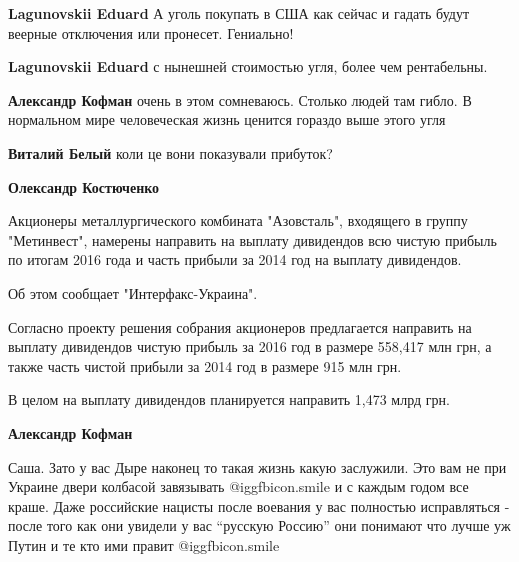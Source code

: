 \begin{itemize}
\begin{itemize}
\textbf{Lagunovskii Eduard} А уголь покупать в США как сейчас и гадать будут веерные отключения или пронесет. Гениально!

\textbf{Lagunovskii Eduard} с нынешней стоимостью угля, более чем рентабельны.

\textbf{Александр Кофман} очень в этом сомневаюсь. Столько людей там гибло. В нормальном мире человеческая жизнь ценится гораздо выше этого угля

\textbf{Виталий Белый} коли це вони показували прибуток?

\textbf{Олександр Костюченко} 

Акционеры металлургического комбината "Азовсталь", входящего в группу
"Метинвест", намерены направить на выплату дивидендов всю чистую прибыль по
итогам 2016 года и часть прибыли за 2014 год на выплату дивидендов.

Об этом сообщает "Интерфакс-Украина".

Согласно проекту решения собрания акционеров предлагается направить на выплату
дивидендов чистую прибыль за 2016 год в размере 558,417 млн грн, а также часть
чистой прибыли за 2014 год в размере 915 млн грн.

В целом на выплату дивидендов планируется направить 1,473 млрд грн.

\textbf{Александр Кофман} 

Саша. Зато у вас Дыре наконец то такая жизнь какую заслужили. Это вам не при
Украине двери колбасой завязывать  @igg{fbicon.smile}  и с каждым годом все краше. Даже
российские нацисты после воевания у вас полностью исправляться - после того как
они увидели у вас \enquote{русскую Россию} они понимают что лучше уж Путин и те кто ими
правит  @igg{fbicon.smile} 

\end{itemize} %

\end{itemize} %
